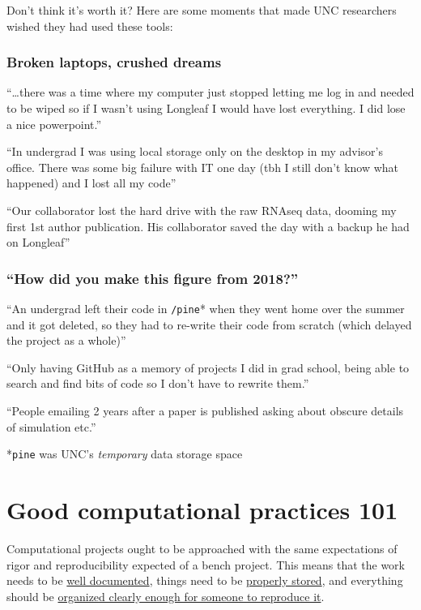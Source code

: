 \documentclass[
  letterpaper,
  DIV=11,
  numbers=noendperiod]{scrreprt}
\begin{document}
Don't think it's worth it? Here are some moments that made UNC
researchers wished they had used these tools:

\hypertarget{broken-laptops-crushed-dreams}{%
\subsubsection{Broken laptops, crushed
dreams}\label{broken-laptops-crushed-dreams}}

``\ldots there was a time where my computer just stopped letting me log
in and needed to be wiped so if I wasn't using Longleaf I would have
lost everything. I did lose a nice powerpoint.''

``In undergrad I was using local storage only on the desktop in my
advisor's office. There was some big failure with IT one day (tbh I
still don't know what happened) and I lost all my code''

``Our collaborator lost the hard drive with the raw RNAseq data, dooming
my first 1st author publication. His collaborator saved the day with a
backup he had on Longleaf''

\hypertarget{how-did-you-make-this-figure-from-2018}{%
\subsubsection{``How did you make this figure from
2018?''}\label{how-did-you-make-this-figure-from-2018}}

``An undergrad left their code in \texttt{/pine}* when they went home
over the summer and it got deleted, so they had to re-write their code
from scratch (which delayed the project as a whole)''

``Only having GitHub as a memory of projects I did in grad school, being
able to search and find bits of code so I don't have to rewrite them.''

``People emailing 2 years after a paper is published asking about
obscure details of simulation etc.''

*\texttt{pine} was UNC's \emph{temporary} data storage space

\hypertarget{good-computational-practices-101}{%
\section{Good computational practices
101}\label{good-computational-practices-101}}

Computational projects ought to be approached with the same expectations
of rigor and reproducibility expected of a bench project. This means
that the work needs to be \uline{well documented}, things need to be
\uline{properly stored}, and everything should be \uline{organized
clearly enough for someone to reproduce it}.
\end{document}
